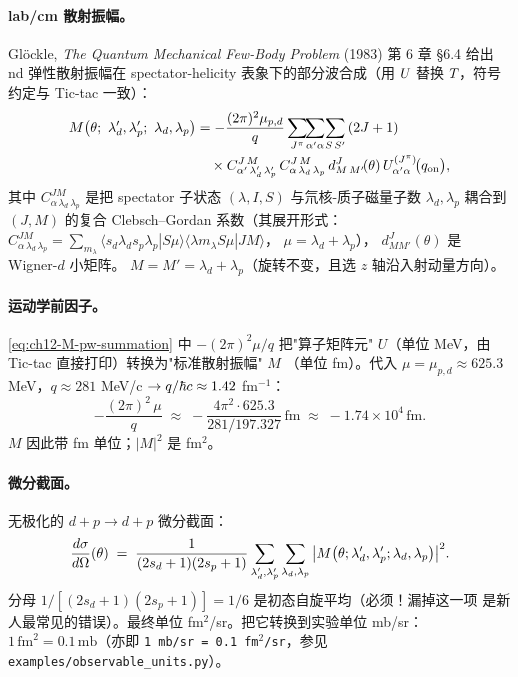 \paragraph{lab/cm 散射振幅。}
Glöckle, \emph{The Quantum Mechanical Few-Body Problem} (1983) 第 6 章 §6.4
给出 nd 弹性散射振幅在 spectator-helicity 表象下的部分波合成（用
\(U_{}\) 替换 \(T_{}\)，符号约定与 Tic-tac 一致）：
\begin{align}
\label{eq:ch12-M-pw-summation}
M\!\left(\theta;\ \lambda_d', \lambda_p';\ \lambda_d, \lambda_p\right)
&= -\frac{(2\pi)^2 \mu_{p,d}}{q}
   \sum_{J^\pi}\!\!\sum_{\alpha' \alpha}\!\sum_{S\,S'}
   \left(2J + 1\right) \notag \\
&\quad \times
   C^{J\,M}_{\alpha'\,\lambda_d'\,\lambda_p'}\,
   C^{J\,M}_{\alpha\,\lambda_d\,\lambda_p}\,
   d^{J}_{M\,M'}\!(\theta)\,
   U^{(J^\pi)}_{\alpha' \alpha}\!\big(q_{\rm on}\big),
\end{align}
其中 \(C^{J M}_{\alpha\,\lambda_d\,\lambda_p}\) 是把 spectator 子状态
\((\lambda, I, S)\) 与氘核-质子磁量子数 \(\lambda_d, \lambda_p\) 耦合到
\((J, M)\) 的复合 Clebsch--Gordan 系数（其展开形式：
\(C^{JM}_{\alpha\,\lambda_d\,\lambda_p}
= \sum_{m_\lambda} \langle s_d \lambda_d s_p \lambda_p | S \mu \rangle
  \langle \lambda m_\lambda S \mu | J M \rangle\)，
\(\mu = \lambda_d + \lambda_p\)），
\(d^J_{M M'}(\theta)\) 是 Wigner-\(d\) 小矩阵。
\(M = M' = \lambda_d + \lambda_p\)（旋转不变，且选 \(z\) 轴沿入射动量方向）。

\paragraph{运动学前因子。}
\cref{eq:ch12-M-pw-summation} 中 \(-(2\pi)^2 \mu/q\) 把"算子矩阵元"
\(U\)（单位 MeV，由 Tic-tac 直接打印）转换为"标准散射振幅" \(M\)
（单位 fm）。代入 \(\mu = \mu_{p,d} \approx 625.3\) MeV，\(q \approx 281\) MeV/c
\(\to q/\hbar c \approx 1.42\) fm\(^{-1}\)：
\begin{equation}
-\frac{(2\pi)^2\,\mu}{q} \;\approx\;
-\frac{4\pi^2 \cdot 625.3}{281/197.327}\,\text{fm}
\;\approx\; -1.74 \times 10^{4}\,\text{fm}.
\end{equation}
\(M\) 因此带 fm 单位；\(|M|^2\) 是 fm\(^2\)。

\paragraph{微分截面。}
无极化的 \(d + p \to d + p\) 微分截面：
\begin{equation}
\label{eq:ch12-dsigma-formula}
\frac{d\sigma}{d\Omega}(\theta) \;=\;
\frac{1}{(2 s_d + 1)(2 s_p + 1)}
\sum_{\lambda_d', \lambda_p'}
\sum_{\lambda_d,  \lambda_p}
\big| M\big(\theta; \lambda_d', \lambda_p'; \lambda_d, \lambda_p\big) \big|^2.
\end{equation}
分母 \(1/[(2 s_d+1)(2 s_p+1)] = 1/6\) 是初态自旋平均（必须！漏掉这一项
是新人最常见的错误）。最终单位 fm\(^2\)/sr。把它转换到实验单位 mb/sr：
\(1\,\text{fm}^2 = 0.1\,\text{mb}\)（亦即 \texttt{1 mb/sr = 0.1 fm}\(^2\)\texttt{/sr}，参见
\texttt{examples/observable\_units.py}）。

